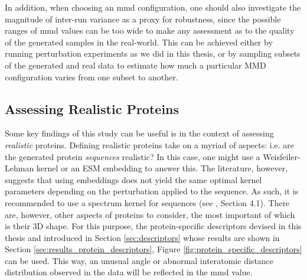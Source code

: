 In addition, when choosing an \acrshort{mmd} configuration, one should also
investigate the magnitude of inter-run variance as a proxy for robustness, since
the possible ranges of \acrshort{mmd} values can be too wide to make any
assessment as to the quality of the generated samples in the real-world. This
can be achieved either by running perturbation experiments as we did in this
thesis, or by sampling subsets of the generated and real data to estimate how
much a particular MMD configuration varies from one subset to another.

\subsection{Assessing Realistic Proteins}\label{sec:discussion_realistic_proteins}

Some key findings of this study can be useful is in the
context of assessing \emph{realistic} proteins. Defining realistic proteins take on a
myriad of aspects: i.e. are the generated protein \emph{sequences} realistic? In this
case, one might use a Weisfeiler-Lehman kernel or an ESM embedding to answer
this. The literature, however, suggests that using embeddings does not yield the
same optimal kernel parameters depending on the perturbation applied to the sequence. As
such, it is recommended to use a spectrum kernel \citep{leslie2002spectrum} for
sequences (see \cite{kucera2022conditional}, Section 4.1). There are, however,
other aspects of proteins to consider, the most important of which is their 3D
shape. For this purpose, the protein-specific descriptors devised in this thesis
and introduced in Section \ref{sec:descriptors} whose results are shown in
Section \ref{sec:results_protein_descriptors}, Figure
\ref{fig:protein_specific_descriptors} can be used. This way, an unusual angle
or abnormal interatomic distance distribution observed in the data will be
reflected in the \acrshort{mmd} value.


